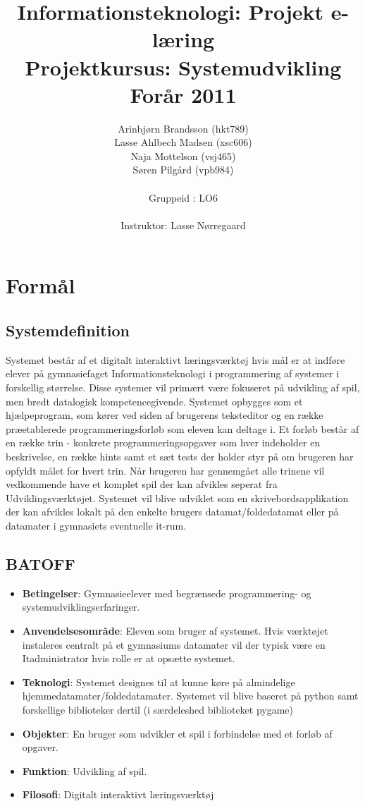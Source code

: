 \documentclass[10pt,a4paper,danish]{article}
\title{Informationsteknologi: Projekt e-læring \\ Projektkursus: Systemudvikling \\Forår 2011}
\author{Arinbjørn Brandsson (hkt789)\\Lasse Ahlbech Madsen (xsc606)\\Naja Mottelson (vsj465)\\Søren Pilgård (vpb984)\\
\\
Gruppeid : LO6\\
\\Instruktor: Lasse Nørregaard}
\begin{document}
\maketitle
\newpage

\tableofcontents
\newpage

\section{Formål}
\subsection{Systemdefinition}
Systemet består af et digitalt interaktivt læringsværktøj hvis mål er at indføre elever på gymnasiefaget Informationsteknologi i programmering af systemer i forskellig størrelse. Disse systemer vil primært være fokuseret på udvikling af spil, men bredt datalogisk kompetencegivende. Systemet opbygges som et hjælpeprogram, som kører ved siden af brugerens teksteditor og en række præetablerede programmeringsforløb som eleven kan deltage i. Et forløb består af en række trin - konkrete programmeringsopgaver som hver indeholder en beskrivelse, en række hints samt et sæt tests der holder styr på om brugeren har opfyldt målet for hvert trin. Når brugeren har gennemgået alle trinene vil vedkommende have et komplet spil der kan afvikles seperat fra Udviklingsværktøjet. Systemet vil blive udviklet som en skrivebordsapplikation der kan afvikles lokalt på den enkelte brugers datamat/foldedatamat eller på datamater i gymnasiets eventuelle it-rum.

\subsection{BATOFF}
\begin{itemize}
\item \textbf{Betingelser}: Gymnasieelever med begrænsede programmering- og systemudviklingserfaringer. 
\item \textbf{Anvendelsesområde}: Eleven som bruger af systemet. Hvis værktøjet instaleres centralt på et
gymnasiums datamater vil der typisk være en Itadministrator hvis rolle er at opsætte systemet.
\item \textbf{Teknologi}: Systemet designes til at kunne køre på almindelige hjemmedatamater/foldedatamater.
Systemet vil blive baseret på python samt forskellige biblioteker dertil (i særdeleshed biblioteket pygame)
\item \textbf{Objekter}: En bruger som udvikler et spil i forbindelse med et forløb af opgaver. 
\item \textbf{Funktion}: Udvikling af spil.
\item \textbf{Filosofi}:  Digitalt interaktivt læringsværktøj
\end{itemize}
\end{document}
